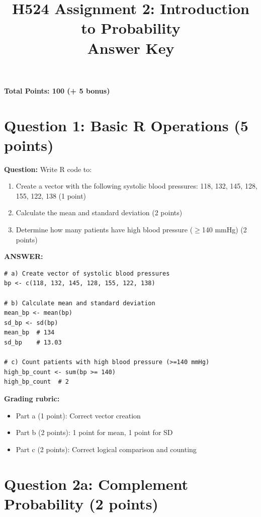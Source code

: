 \documentclass[11pt]{article}
\title{\textbf{\textcolor{osuorange}{H524 Assignment 2: Introduction to Probability}}\\
\Large Answer Key}
\author{}
\date{}
\begin{document}
\maketitle
\thispagestyle{fancy}

\noindent\textbf{Total Points: 100 (+ 5 bonus)}

\vspace{0.3cm}
\noindent\hrulefill

\section*{Question 1: Basic R Operations (5 points)}

\textbf{Question:} Write R code to:
\begin{enumerate}
    \item[a)] Create a vector with the following systolic blood pressures: 118, 132, 145, 128, 155, 122, 138 (1 point)
    \item[b)] Calculate the mean and standard deviation (2 points)
    \item[c)] Determine how many patients have high blood pressure ($\geq$140 mmHg) (2 points)
\end{enumerate}

\textbf{ANSWER:}

\begin{lstlisting}[style=Rstyle]
# a) Create vector of systolic blood pressures
bp <- c(118, 132, 145, 128, 155, 122, 138)

# b) Calculate mean and standard deviation
mean_bp <- mean(bp)
sd_bp <- sd(bp)
mean_bp  # 134
sd_bp    # 13.03

# c) Count patients with high blood pressure (>=140 mmHg)
high_bp_count <- sum(bp >= 140)
high_bp_count  # 2
\end{lstlisting}

\textbf{Grading rubric:}
\begin{itemize}
    \item Part a (1 point): Correct vector creation
    \item Part b (2 points): 1 point for mean, 1 point for SD
    \item Part c (2 points): Correct logical comparison and counting
\end{itemize}

\vspace{0.3cm}
\noindent\hrulefill

\section*{Question 2a: Complement Probability (2 points)}
\end{document}
